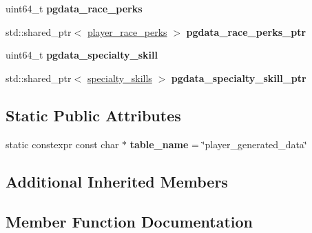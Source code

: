 \begin{DoxyCompactItemize}
uint64\+\_\+t {\bfseries pgdata\+\_\+race\+\_\+perks}
\item 
\mbox{\label{structmods_1_1orm_1_1player__generated__data_abb6ac4d1a2f867c6aad0c20f829574a6}} 
std\+::shared\+\_\+ptr$<$ \hyperlink{structmods_1_1orm_1_1player__race__perks}{player\+\_\+race\+\_\+perks} $>$ {\bfseries pgdata\+\_\+race\+\_\+perks\+\_\+ptr}
\item 
\mbox{\label{structmods_1_1orm_1_1player__generated__data_adfbc57757f3e979ceeaad393f4b774e0}} 
uint64\+\_\+t {\bfseries pgdata\+\_\+specialty\+\_\+skill}
\item 
\mbox{\label{structmods_1_1orm_1_1player__generated__data_a53472575217d697f8c9861a465017025}} 
std\+::shared\+\_\+ptr$<$ \hyperlink{structmods_1_1orm_1_1specialty__skills}{specialty\+\_\+skills} $>$ {\bfseries pgdata\+\_\+specialty\+\_\+skill\+\_\+ptr}
\end{DoxyCompactItemize}
\subsection*{Static Public Attributes}
\begin{DoxyCompactItemize}
\item 
\mbox{\label{structmods_1_1orm_1_1player__generated__data_a7d413bdc544be304bac10bbafa770a81}} 
static constexpr const char $\ast$ {\bfseries table\+\_\+name} = \char`\"{}player\+\_\+generated\+\_\+data\char`\"{}
\end{DoxyCompactItemize}
\subsection*{Additional Inherited Members}


\subsection{Member Function Documentation}
\mbox{\label{structmods_1_1orm_1_1player__generated__data_ac6a622c219c6d50c3f054aef965e4363}} 
